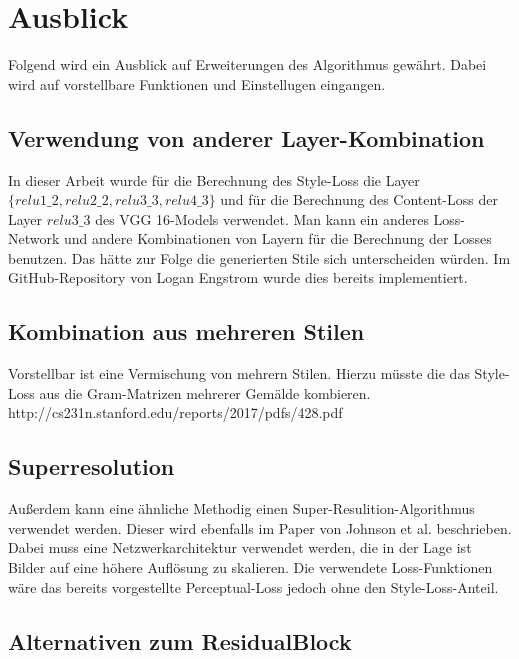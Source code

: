 \section{Ausblick}

Folgend wird ein Ausblick auf Erweiterungen des Algorithmus gewährt. Dabei wird auf vorstellbare Funktionen und Einstellugen eingangen.

\subsection{Verwendung von anderer Layer-Kombination}

In dieser Arbeit wurde für die Berechnung des Style-Loss die Layer $ \{ relu1\_2, relu2\_2, relu3\_3, relu4\_3 \} $ und für die Berechnung des Content-Loss der Layer  $ relu3\_3 $ des VGG 16-Models verwendet. Man kann ein anderes Loss-Network und andere Kombinationen von Layern für die Berechnung der Losses benutzen. Das hätte zur Folge die generierten Stile sich unterscheiden würden. Im GitHub-Repository von Logan Engstrom  \cite{engstrom2016faststyletransfer} wurde dies bereits implementiert.

\subsection{Kombination aus mehreren Stilen}
\label{sec:combination_many_styles}

Vorstellbar ist eine Vermischung von mehrern Stilen. Hierzu müsste die das Style-Loss aus die Gram-Matrizen mehrerer Gemälde kombieren.
http://cs231n.stanford.edu/reports/2017/pdfs/428.pdf

\subsection{Superresolution}
\label{sec:superresolution}

Außerdem kann eine ähnliche Methodig einen Super-Resulition-Algorithmus verwendet werden. Dieser wird ebenfalls im Paper von Johnson et al. \cite{DBLP:journals/corr/JohnsonAL16} beschrieben. Dabei muss eine Netzwerkarchitektur verwendet werden, die in der Lage ist Bilder auf eine höhere Auflösung zu skalieren. Die verwendete Loss-Funktionen wäre das bereits vorgestellte Perceptual-Loss jedoch ohne den Style-Loss-Anteil.

\subsection{Alternativen zum ResidualBlock}
\label{sec:alternatives_to_residual_block}

